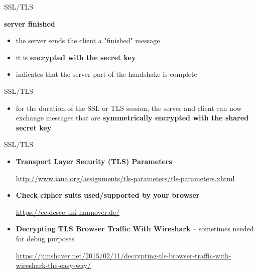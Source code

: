 \documentclass[pdf]{beamer}
\begin{document}
\begin{frame}{SSL/TLS}

\textbf{server finished}

\begin{itemize}
\item
the server sends the client a "finished" message

\item
it is \textbf{encrypted with the secret key}

\item
indicates that the server part of the handshake is complete
\end{itemize}
\end{frame}


\begin{frame}{SSL/TLS}
\begin{itemize}
\item
for the duration of the SSL or TLS session, the server and client can now exchange messages that are \textbf{symmetrically encrypted with the shared secret key}
\end{itemize}
\end{frame}



\begin{frame}{SSL/TLS}
\begin{itemize}
\item
\textbf{Transport Layer Security (TLS) Parameters}

\url{http://www.iana.org/assignments/tls-parameters/tls-parameters.xhtml}
\newline

\item
\textbf{Check cipher suits used/supported by your browser}

\url{https://cc.dcsec.uni-hannover.de/}
\newline

\item
\textbf{Decrypting TLS Browser Traffic With Wireshark} – sometimes needed for debug purposes

\url{https://jimshaver.net/2015/02/11/decrypting-tls-browser-traffic-with-wireshark-the-easy-way/}

\end{itemize}
\end{frame}
\end{document}
